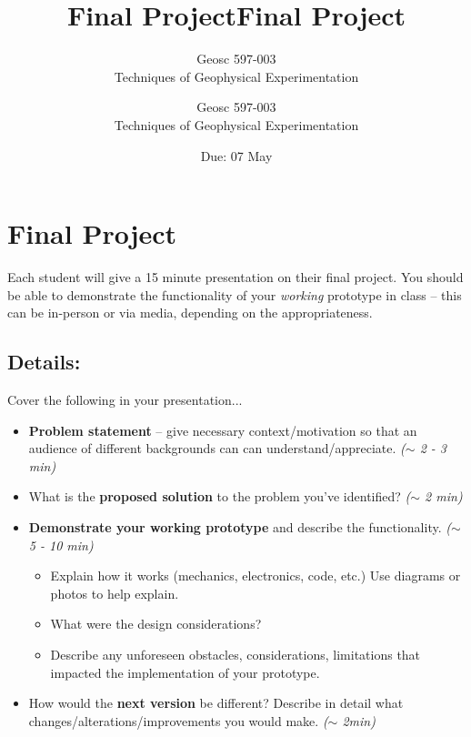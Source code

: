 \documentclass[10pt]{article}
\title{Final Project} %
\author{Geosc 597-003 \\
		Techniques of Geophysical Experimentation} %
\date{Due: #1}
\newcommand{\titler}[1]{
	\title{Final Project} %
	\author{Geosc 597-003 \\
		Techniques of Geophysical Experimentation} %
	\date{Due: #1}
	
	\maketitle}
\begin{document}

\titler{07 May}

\section*{Final Project}
Each student will give a 15 minute presentation on their final project. You should be able to demonstrate the functionality of your \textit{working} prototype in class -- this can be in-person or via media, depending on the appropriateness. 

\subsection*{Details:}
Cover the following in your presentation...
\begin{itemize}
	\item \textbf{Problem statement} -- give necessary context/motivation so that an audience of different backgrounds can can understand/appreciate. \textit{($\sim $ 2 - 3 min)}
	\item What is the \textbf{proposed solution} to the problem you've identified? \textit{($\sim $  2 min)}
	\item \textbf{Demonstrate your working prototype} and describe the functionality. \textit{($\sim $ 5 - 10 min)}
	\begin{itemize}
		\item Explain how it works (mechanics, electronics, code, etc.) Use diagrams or photos to help explain.
		\item What were the design considerations?
		\item Describe any unforeseen obstacles, considerations, limitations that impacted the implementation of your prototype.
	\end{itemize}
	\item How would the \textbf{next version} be different? Describe in detail what changes/alterations/improvements you would make. \textit{($\sim $ 2min)}
\end{itemize}
\end{document}
